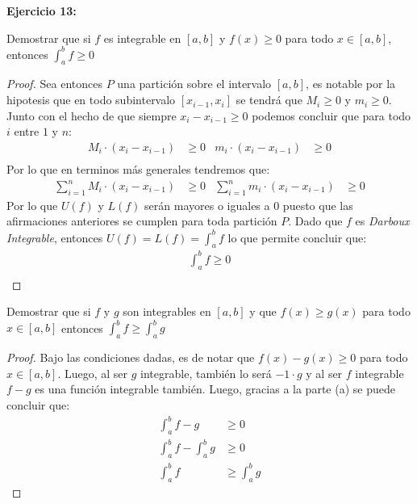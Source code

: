 \documentclass[../../main.tex]{subfiles}
\begin{document}
\question \textbf{Ejercicio 13:}
\begin{partes}
    \parte Demostrar que si $f$ es integrable en $[a, b]$ y $f(x) \ge 0$ para todo $x \in [a, b]$, entonces $\int_a^b f \ge 0$
    \begin{proof}
        Sea entonces $P$ una partición sobre el intervalo $[a, b]$, es notable por la hipotesis que en todo subintervalo $[x_{i-1}, x_i]$ se tendrá que
        $M_i \ge 0$ y $m_i \ge 0$. Junto con el hecho de que siempre $x_i - x_{i-1} \ge 0$ podemos concluir que para todo $i$ entre $1$ y $n$:
        \begin{align*}
            M_i \cdot (x_i - x_{i-1}) &\ge 0 & m_i \cdot (x_i - x_{i-1}) &\ge 0\\
        \end{align*}
        Por lo que en terminos más generales tendremos que:
        \begin{align*}
            \sum_{i=1}^n M_i \cdot (x_i - x_{i-1}) &\ge 0 & \sum_{i = 1}^n m_i \cdot (x_i - x_{i-1}) &\ge 0
        \end{align*}
        Por lo que $U(f)$ y $L(f)$ serán mayores o iguales a $0$ puesto que las afirmaciones anteriores se cumplen para toda partición $P$.
        Dado que $f$ es \textit{Darboux Integrable}, entonces $U(f) = L(f) = \int_a^b f$ lo que permite concluir que:
        \begin{align*}
            \int_a^b f \ge 0\\
        \end{align*}
    \end{proof}
    \parte Demostrar que si $f$ y $g$ son integrables en $[a, b]$ y que $f(x) \ge g(x)$ para todo $x \in [a, b]$ entonces $\int_a^b f \ge \int_a^b g$
    \begin{proof}
        Bajo las condiciones dadas, es de notar que $f(x) - g(x) \ge 0$ para todo $x \in [a, b]$. Luego, al ser $g$ integrable, también lo será
        $-1 \cdot g$ y al ser $f$ integrable $f-g$ es una función integrable también. Luego, gracias a la parte (a) se puede concluir que:
        \begin{align*}
            \int_a^b f-g &\ge 0\\
            \int_a^b f - \int_a^b g & \ge 0\\
            \int_a^b f & \ge \int_a^b g
        \end{align*}
    \end{proof}
\end{partes}
\end{document}
